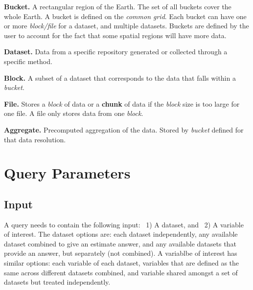 \textbf{Bucket.} A rectangular region of the Earth. The set of all buckets cover the whole Earth. A bucket is defined on the \emph{common grid}. Each bucket can have one or more \emph{block/file} for a dataset, and multiple datasets. Buckets are defined by the user to account for the fact that some spatial regions will have more data.

\textbf{Dataset.} Data from a specific repository generated or collected through a specific method.

\textbf{Block.} A subset of a dataset that corresponds to the data that falls within a \emph{bucket}. 

\textbf{File.} Stores a \emph{block} of data or a \textbf{chunk} of data if the \emph{block} size is too large for one file. A file only stores data from one \emph{block}.

\textbf{Aggregate.} Precomputed aggregation of the data. Stored by \emph{bucket} defined for that data resolution.

\section{Query Parameters}

\subsection{Input}
A query needs to contain the following input: ~1) A dataset, and ~2) A variable of interest. The dataset options are: each dataset independently, any available dataset combined to give an estimate answer, and any available datasets that provide an answer, but separately (not combined). A variablbe of interest has similar options: each variable of each dataset, variables that are defined as the same across different datasets combined, and variable shared amongst a set of datasets but treated independently. 


